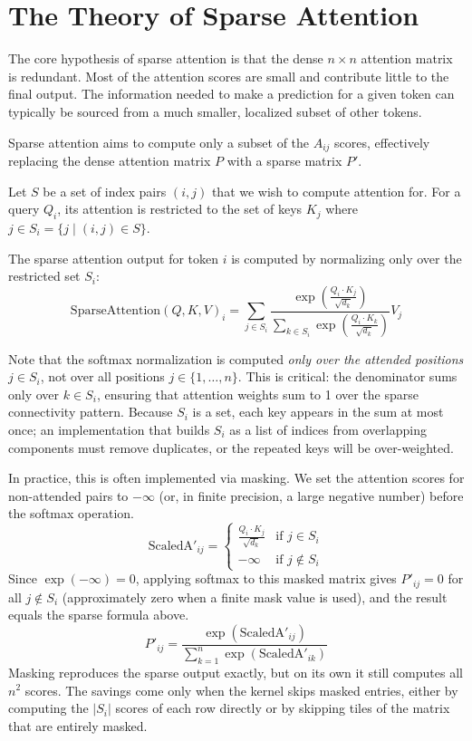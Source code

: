 \documentclass{article}
\begin{document}
\section{The Theory of Sparse Attention}

The core hypothesis of sparse attention is that the dense \(n \times n\) attention matrix is redundant. Most of the attention scores are small and contribute little to the final output. The information needed to make a prediction for a given token can typically be sourced from a much smaller, localized subset of other tokens.

Sparse attention aims to compute only a subset of the \(A_{ij}\) scores, effectively replacing the dense attention matrix \(P\) with a sparse matrix \(P'\).

Let \(S\) be a set of index pairs \((i, j)\) that we wish to compute attention for. For a query \(Q_i\), its attention is restricted to the set of keys \(K_j\) where \(j \in S_i = \{j \mid (i, j) \in S\}\).

The sparse attention output for token \(i\) is computed by normalizing only over the restricted set \(S_i\):
\[
\text{SparseAttention}(Q, K, V)_i = \sum_{j \in S_i} \frac{\exp\left(\frac{Q_i \cdot K_j}{\sqrt{d_k}}\right)}{\sum_{k \in S_i} \exp\left(\frac{Q_i \cdot K_k}{\sqrt{d_k}}\right)} V_j
\]

Note that the softmax normalization is computed \emph{only over the attended positions} \(j \in S_i\), not over all positions \(j \in \{1, \ldots, n\}\). This is critical: the denominator sums only over \(k \in S_i\), ensuring that attention weights sum to 1 over the sparse connectivity pattern. Because \(S_i\) is a set, each key appears in the sum at most once; an implementation that builds \(S_i\) as a list of indices from overlapping components must remove duplicates, or the repeated keys will be over-weighted.

In practice, this is often implemented via masking. We set the attention scores for non-attended pairs to \(-\infty\) (or, in finite precision, a large negative number) before the softmax operation.
\[
\text{ScaledA}'_{ij} =
\begin{cases}
\frac{Q_i \cdot K_j}{\sqrt{d_k}} & \text{if } j \in S_i \\
-\infty & \text{if } j \notin S_i
\end{cases}
\]
Since \(\exp(-\infty) = 0\), applying softmax to this masked matrix gives \(P'_{ij} = 0\) for all \(j \notin S_i\) (approximately zero when a finite mask value is used), and the result equals the sparse formula above.
\[
P'_{ij} = \frac{\exp(\text{ScaledA}'_{ij})}{\sum_{k=1}^{n} \exp(\text{ScaledA}'_{ik})}
\]
Masking reproduces the sparse output exactly, but on its own it still computes all \(n^2\) scores. The savings come only when the kernel skips masked entries, either by computing the \(|S_i|\) scores of each row directly or by skipping tiles of the matrix that are entirely masked.
\end{document}
